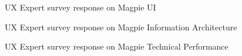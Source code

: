 \begin{figure}
  \centering
  \caption{UX Expert survey response on Magpie UI}
\end{figure}
\begin{figure}
  \centering
  \caption{UX Expert survey response on Magpie Information Architecture}
\end{figure}
\begin{figure}
  \centering
  \caption{UX Expert survey response on Magpie Technical Performance}
\end{figure}
